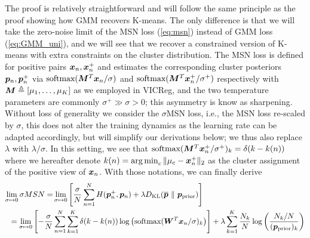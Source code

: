 \documentclass{article} %
\begin{document}
The proof is relatively straightforward and will follow the same principle as the proof showing how GMM recovers K-means. The only difference is that we will take the zero-noise limit of the MSN loss (\eqref{eq:msn}) instead of GMM loss (\eqref{eq:GMM_uni}), and we will see that we recover a constrained version of K-means with extra constraints on the cluster distribution.
The MSN loss is defined for positive pairs ${\bm{x}}_n,{\bm{x}}_n^+$ and estimates the corresponding cluster posteriors ${\bm{p}}_n,{\bm{p}}_n^+$ via 
$\text{softmax}({\bm{M}}^T{\bm{x}}_n/\sigma)$ and $\text{softmax}({\bm{M}}^T{\bm{x}}^+_n/\sigma^+)$ respectively with ${\bm{M}}\triangleq [\mu_1,\dots,\mu_K]$ as we employed in VICReg, and the two temperature parameters are commonly $\sigma^+ \gg \sigma>0$; this asymmetry is know as sharpening. Without loss of generality we consider the $\sigma$MSN loss, i.e., the MSN loss re-scaled by $\sigma$, this does not alter the training dynamics as the learning rate can be adapted accordingly, but will simplify our derivations below; we thus also replace $\lambda$ with $\lambda/\sigma$. In this setting, we see that $\text{softmax}({\bm{M}}^T{\bm{x}}^+_n/\sigma^+)_k=\delta(k-k(n))$ where we hereafter denote $k(n)=\operatorname*{arg\,min}_{c}\|\mu_c-{\bm{x}}_n^+\|_2$ as the cluster assignment of the positive view of ${\bm{x}}_n$. With those notations, we can finally derive
\begin{align*}
\lim_{\sigma \mapsto 0 } \sigma MSN =&\lim_{\sigma \mapsto 0 }\left[\frac{\sigma}{N} \sum^N_{n=1} H(\vp_{n}^+, \vp_n) + \lambda D_{\text{KL}}({\overline{\vp}\ \lVert\ \vp_\text{prior}})\right]\\
&\hspace{-2cm}=\lim_{\sigma \mapsto 0 }\left[-\frac{\sigma}{N}\sum_{n=1}^{N}\sum_{k=1}^{K}\delta(k-k(n))\log\left(\text{softmax}(\mW^T\vx_n/\sigma)_k\right)\right]+\lambda \sum_{k=1}^{K} \frac{N_k}{N}\log\left(\frac{N_k/N}{(\vp_{\rm prior})_k}\right)
\end{align*}
\end{document}
